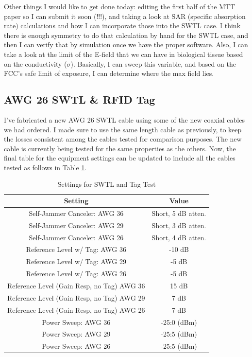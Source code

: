 \documentclass[12pt,onecolumn,titlepage]{article}
\begin{document}
Other things I would like to get done today: editing the first half of the MTT paper so I can submit it soon (!!!), and taking a look at SAR (specific absorption rate) calculations and how I can incorporate those into the SWTL case. I think there is enough symmetry to do that calculation by hand for the SWTL case, and then I can verify that by simulation once we have the proper software. Also, I can take a look at the limit of the E-field that we can have in biological tissue based on the conductivity ($\sigma$). Basically, I can sweep this variable, and based on the FCC's safe limit of exposure, I can determine where the max field lies. 

\subsection{AWG 26 SWTL \& RFID Tag}
\indent \indent I've fabricated a new AWG 26 SWTL cable using some of the new coaxial cables we had ordered. I made sure to use the same length cable as previously, to keep the losses consistent among the cables tested for comparison purposes. The new cable is currently being tested for the same properties as the others. Now, the final table for the equipment settings can be updated to include all the cables tested as follows in Table \ref{tab:SWTL_w_tag_test_settings_final}.


\begin{table}[h!]
\centering
	\caption{ Settings for SWTL and Tag Test }
	\begin{tabular}{| c | c |}
	\hline
	{\bf Setting} & {\bf Value} \\ \hline
	Self-Jammer Canceler: AWG 36 & Short, 5 dB atten.  \\ \hline
	Self-Jammer Canceler: AWG 29 & Short, 3 dB atten.  \\ \hline
	Self-Jammer Canceler: AWG 26 & Short, 4 dB atten.  \\ \hline
	Reference Level w/ Tag: AWG 36 & -10 dB  \\ \hline
	Reference Level w/ Tag: AWG 29 & -5 dB  \\ \hline
	Reference Level w/ Tag: AWG 26 & -5 dB  \\ \hline
	Reference Level (Gain Resp, no Tag) AWG 36 & 15 dB \\ \hline
	Reference Level (Gain Resp, no Tag) AWG 29 & 7 dB \\ \hline
	Reference Level (Gain Resp, no Tag) AWG 26 & 7 dB \\ \hline
	Power Sweep: AWG 36 & -25:0 (dBm)  \\ \hline
	Power Sweep: AWG 29 & -25:5 (dBm) \\ \hline
	Power Sweep: AWG 26 & -25:5 (dBm) \\ \hline
	\end{tabular}
\label{tab:SWTL_w_tag_test_settings_final}
\end{table}
\end{document}
